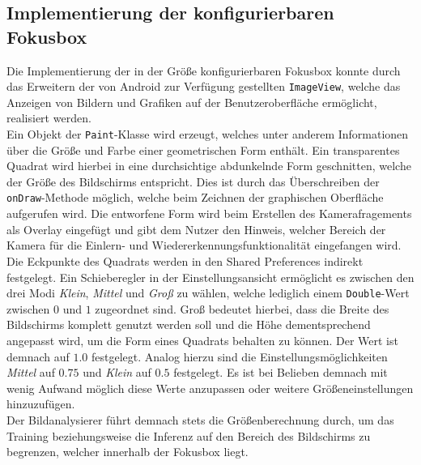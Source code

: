 \documentclass[oneside]{ausarbeitung}
\begin{document}
\subsection{Implementierung der konfigurierbaren Fokusbox}
Die Implementierung der in der Größe konfigurierbaren Fokusbox konnte durch das Erweitern der von Android zur Verfügung gestellten \texttt{ImageView}, welche das Anzeigen von Bildern und Grafiken auf der Benutzeroberfläche ermöglicht, realisiert werden.\\
Ein Objekt der \texttt{Paint}-Klasse wird erzeugt, welches unter anderem Informationen über die Größe und Farbe einer geometrischen Form enthält. Ein transparentes Quadrat wird hierbei in eine durchsichtige abdunkelnde Form geschnitten, welche der Größe des Bildschirms entspricht. Dies ist durch das Überschreiben der \texttt{onDraw}-Methode möglich, welche beim Zeichnen der graphischen Oberfläche aufgerufen wird. Die entworfene Form wird beim Erstellen des Kamerafragements als Overlay eingefügt und gibt dem Nutzer den Hinweis, welcher Bereich der Kamera für die Einlern- und Wiedererkennungsfunktionalität eingefangen wird.\\
Die Eckpunkte des Quadrats werden in den Shared Preferences indirekt festgelegt. Ein Schieberegler in der Einstellungsansicht ermöglicht es zwischen den drei Modi \textit{Klein}, \textit{Mittel} und \textit{Groß} zu wählen, welche lediglich einem \texttt{Double}-Wert zwischen $0$ und $1$ zugeordnet sind. Groß bedeutet hierbei, dass die Breite des Bildschirms komplett genutzt werden soll und die Höhe dementsprechend angepasst wird, um die Form eines Quadrats behalten zu können. Der Wert ist demnach auf $1.0$ festgelegt. Analog hierzu sind die Einstellungsmöglichkeiten \textit{Mittel} auf $0.75$ und \textit{Klein} auf $0.5$ festgelegt. Es ist bei Belieben demnach mit wenig Aufwand möglich diese Werte anzupassen oder weitere Größeneinstellungen hinzuzufügen.\\
Der Bildanalysierer führt demnach stets die Größenberechnung durch, um das Training beziehungsweise die Inferenz auf den Bereich des Bildschirms zu begrenzen, welcher innerhalb der Fokusbox liegt.
\end{document}
